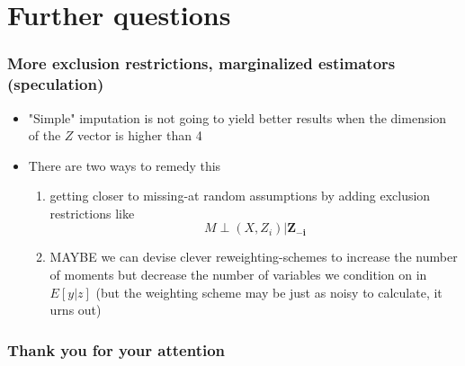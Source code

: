 \documentclass[compress,mathserif]{beamer}
\begin{document}
\section{Further questions}\hypertarget{Further questions}{}


\begin{frame}\frametitle{More exclusion restrictions, marginalized estimators (speculation)}\hypertarget{More exclusion restrictions}{}
\begin{itemize}
	\item "Simple" imputation is not going to yield better results when the dimension of the $Z$ vector is higher than 4
	\item There are two ways to remedy this
	\begin{enumerate}
		\item getting closer to missing-at random assumptions by adding exclusion restrictions like
		\[M \perp (X, Z_i) | \mathbf{Z_{-i}}
		\]
		\item MAYBE we can devise clever reweighting-schemes to increase the number of moments but decrease the number of variables we condition on in $E[y|z]$ (but the weighting scheme may be just as noisy to calculate, it urns out) 
	\end{enumerate}
\end{itemize}
\end{frame}


\begin{frame}\frametitle{Thank you for your attention}\hypertarget{Thank you for your attention}{}
\end{frame}
\end{document}
